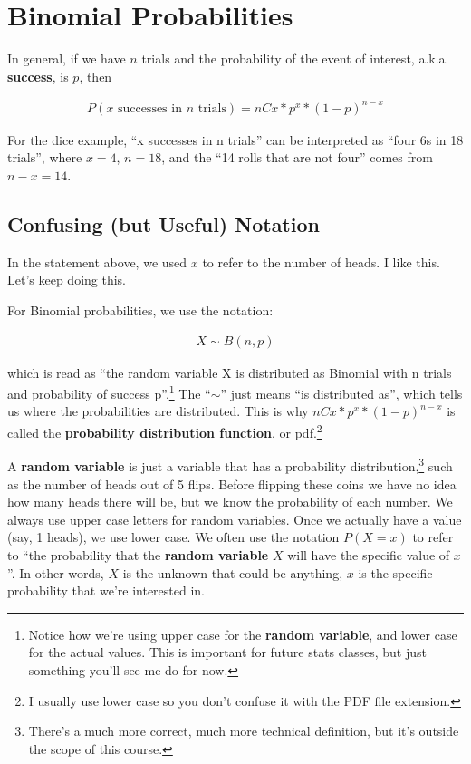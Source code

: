\documentclass[
  letterpaper,
  DIV=11,
  numbers=noendperiod]{scrreprt}
\begin{document}
\hypertarget{binomial-probabilities-1}{%
\chapter{Binomial Probabilities}\label{binomial-probabilities-1}}

In general, if we have \(n\) trials and the probability of the event of
interest, a.k.a. \textbf{success}, is \(p\), then

\begin{align*}
P(x\text{ successes in }n\text{ trials}) = nCx*p^x*(1-p)^{n-x}
\end{align*}

For the dice example, ``x successes in n trials'' can be interpreted as
``four 6s in 18 trials'', where \(x=4\), \(n=18\), and the ``14 rolls
that are not four'' comes from \(n-x=14\).

\hypertarget{confusing-but-useful-notation}{%
\section{Confusing (but Useful)
Notation}\label{confusing-but-useful-notation}}

In the statement above, we used \(x\) to refer to the number of heads. I
like this. Let's keep doing this.

For Binomial probabilities, we use the notation:

\begin{align*}
X \sim B(n,p)
\end{align*}

which is read as ``the random variable X is distributed as Binomial with
n trials and probability of success p''.\footnote{Notice how we're using
  upper case for the \textbf{random variable}, and lower case for the
  actual values. This is important for future stats classes, but just
  something you'll see me do for now.} The ``\(\sim\)'' just means ``is
distributed as'', which tells us where the probabilities are
distributed. This is why \(nCx*p^x*(1-p)^{n-x}\) is called the
\textbf{probability distribution function}, or pdf.\footnote{I usually
  use lower case so you don't confuse it with the PDF file extension.}

A \textbf{random variable} is just a variable that has a probability
distribution,\footnote{There's a much more correct, much more technical
  definition, but it's outside the scope of this course.} such as the
number of heads out of 5 flips. Before flipping these coins we have no
idea how many heads there will be, but we know the probability of each
number. We always use upper case letters for random variables. Once we
actually have a value (say, 1 heads), we use lower case. We often use
the notation \(P(X = x)\) to refer to ``the probability that the
\textbf{random variable} \(X\) will have the specific value of \(x\)''.
In other words, \(X\) is the unknown that could be anything, \(x\) is
the specific probability that we're interested in.
\end{document}
